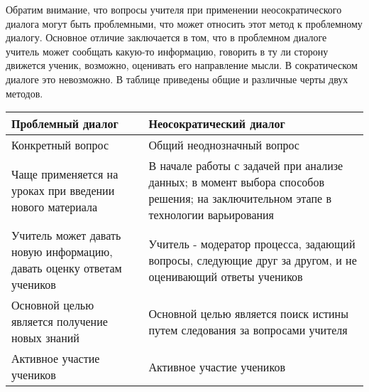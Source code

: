 \documentclass[a4paper,14pt,russian]{extreport}
\begin{document}
Обратим внимание, что вопросы учителя при применении неосократического диалога могут быть проблемными, что может относить этот метод к проблемному диалогу. Основное отличие заключается в том, что в проблемном диалоге учитель может сообщать какую-то информацию, говорить в ту ли сторону движется ученик, возможно, оценивать его направление мысли. В сократическом диалоге это невозможно. В таблице приведены общие и различные черты двух методов.
\par 
\vspace{2\baselineskip}
\begin {small}
\begin{tabularx}{0.8\textwidth} { 
  | >{\centering\arraybackslash}X 
  | >{\centering\arraybackslash}X| }
 \hline
 \textbf{Проблемный диалог} & \textbf{Неосократический диалог}  \\
 \hline
 Конкретный вопрос  & Общий неоднозначный вопрос    \\
\hline
Чаще применяется на уроках при введении нового материала & В начале работы с задачей при анализе данных; в момент выбора способов решения; на заключительном этапе в технологии варьирования\\
\hline
Учитель может давать новую информацию, давать оценку ответам учеников & Учитель - модератор процесса, задающий вопросы, следующие друг за другом, и не оценивающий ответы учеников\\
\hline
Основной целью является получение новых знаний & Основной целью является поиск истины путем следования за вопросами учителя \\
 \hline
 Активное участие учеников & Активное участие учеников\\
\hline
\end{tabularx}
\end{small}
\par
\end{document}
